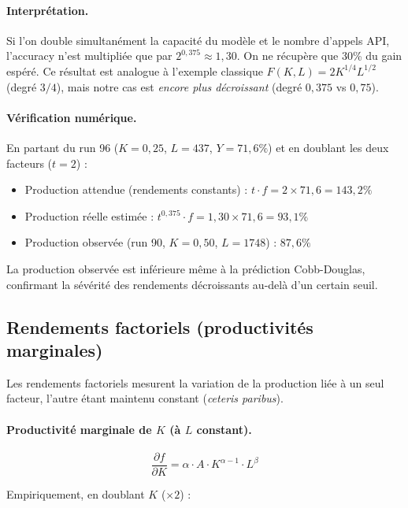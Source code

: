 \paragraph{Interprétation.} Si l'on double simultanément la capacité du modèle et le nombre d'appels API, l'accuracy n'est multipliée que par $2^{0,375} \approx 1{,}30$. On ne récupère que 30\% du gain espéré. Ce résultat est analogue à l'exemple classique $F(K,L) = 2K^{1/4}L^{1/2}$ (degré $3/4$), mais notre cas est \textit{encore plus décroissant} (degré $0{,}375$ vs $0{,}75$).

\paragraph{Vérification numérique.} En partant du run 96 ($K = 0{,}25$, $L = 437$, $Y = 71{,}6\%$) et en doublant les deux facteurs ($t = 2$) :
\begin{itemize}
    \item Production attendue (rendements constants) : $t \cdot f = 2 \times 71{,}6 = 143{,}2\%$
    \item Production réelle estimée : $t^{0,375} \cdot f = 1{,}30 \times 71{,}6 = 93{,}1\%$
    \item Production observée (run 90, $K = 0{,}50$, $L = 1748$) : $87{,}6\%$
\end{itemize}

La production observée est inférieure même à la prédiction Cobb-Douglas, confirmant la sévérité des rendements décroissants au-delà d'un certain seuil.

\subsection{Rendements factoriels (productivités marginales)}

Les rendements factoriels mesurent la variation de la production liée à un seul facteur, l'autre étant maintenu constant (\textit{ceteris paribus}).

\paragraph{Productivité marginale de $K$ (à $L$ constant).}

\begin{equation}
\frac{\partial f}{\partial K} = \alpha \cdot A \cdot K^{\alpha - 1} \cdot L^{\beta}
\end{equation}

Empiriquement, en doublant $K$ ($\times 2$) :

